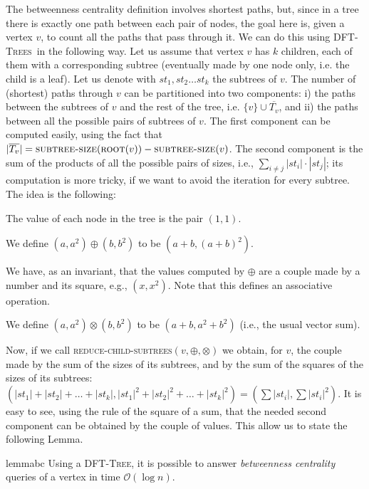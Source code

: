 \documentclass[a4paper,USenglish]{lipics}
\newcommand{\bigoh}{\mathcal{O}}
\newcommand{\dft}{\textsc{DFT-Tree}}
\newcommand{\dfts}{\textsc{DFT-Trees}}
\begin{document}
The betweenness centrality definition involves shortest paths, but, since in  a tree there is exactly one path between each pair of nodes, the goal here is, given a vertex $v$, to count all the paths that pass through it. We can do this using \dfts\ in the following way. Let us assume that vertex $v$ has $k$ children, each of them with a corresponding subtree (eventually made by one node only, i.e. the child is a leaf). Let us denote with $st_1, st_2 \ldots st_k$ the subtrees of $v$. The number of (shortest) paths through $v$ can be partitioned into two  components: i) the paths between the subtrees of $v$ and the rest of the tree, i.e. $\{v\} \cup \overline{T_v}$, and ii) the paths between all the possible pairs of subtrees of $v$. The first component can be computed easily, using the fact that  $|\overline{T_v}| = \textsc{subtree-size}(\textsc{root}(v)) - \textsc{subtree-size}(v)$. The second component is the sum of the products of all the possible pairs of sizes, i.e., $\sum_{i \neq j} |st_i|\cdot|st_j|$; its computation is more tricky, if we want to avoid the iteration for every subtree. The idea is the following: 
\begin{compactitem}
				\item The value of each node in the tree is the pair $(1,1)$.
				\item We define $(a,a^2) \oplus (b, b^2)$ to be $(a+b, (a+b)^2)$.
				\item We have, as an invariant, that the values computed by  $\oplus$ are a couple made by a number and its square, e.g., $(x, x^2)$. Note that this defines an associative operation.
				\item We define $(a,a^2) \otimes (b,b^2)$ to be $(a+b, a^2 + b^2)$ (i.e., the usual vector sum). 
			\end{compactitem}
Now, if we call \textsc{reduce-child-subtrees}$(v, \oplus, \otimes)$ we obtain, for $v$, the couple made by the sum of the sizes of its subtrees, and by the sum of the squares of the sizes of its subtrees: $(|st_1| + |st_2| + \ldots + |st_k|,|st_1|^2 + |st_2|^2 + \ldots + |st_k|^2)=(\sum |st_i|, \sum |st_i|^2)$. It is easy to see, using the rule of the square of a sum, that the needed second component can be obtained by the couple of values. This allow us to state the following Lemma.
\begin{restatable}{lemma}{bc}
Using a \dft, it is possible to answer \emph{betweenness centrality} queries of a vertex  in time $\bigoh (\log n)$.
\end{restatable}
\end{document}
